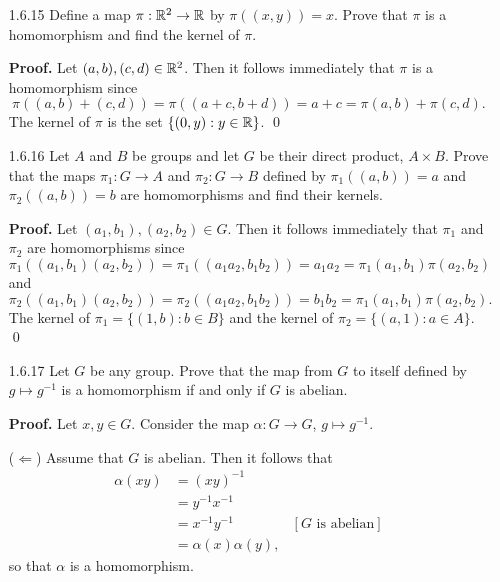\begin{enumerate}
      ($\Leftarrow$) Assume that ker($\varphi$) = $\{1_G\}$. Suppose that
      $\varphi(g_1) = \varphi(g_2)$ for some $g_1, g_2 \in G$. Then it follows
      that $\varphi(g_1)\varphi(g_2)^{-1} = 1_H$, so that
      $\varphi(g_1{g_2}^{-1}) = 1_H$. Since ker($\varphi$) = $\{1_G\}$, we can
      conclude that $g_1{g_2}^{-1} = 1_G$, so that $g_1 = g_2$; i.e., $\varphi$
      is injective. \qed      
   \item[1.6.15]  Define a map $\pi : \mathbb{R}^2 \rightarrow \mathbb{R}$ by $\pi((x, y)) = x$.
                  Prove that $\pi$ is a homomorphism and find the kernel of
                  $\pi$.

      \textbf{Proof.} Let $(a, b), (c, d) \in \mathbb{R}^2$. Then it follows immediately
      that $\pi$ is a homomorphism since
      $$\pi((a, b) + (c, d)) = \pi((a + c, b + d)) =
         a + c = \pi(a, b) + \pi(c, d).$$
      The kernel of $\pi$ is the set $\{(0, y) : y \in \mathbb{R}\}$. \qed
   \item[1.6.16]  Let $A$ and $B$ be groups and let $G$ be their direct product,
                  $A \times B$. Prove that the maps $\pi_1 : G \rightarrow A$
                  and $\pi_2 : G \rightarrow B$ defined by $\pi_1((a, b)) = a$
                  and $\pi_2((a, b)) = b$ are homomorphisms and find their
                  kernels.

      \textbf{Proof.} Let $(a_1, b_1), (a_2, b_2) \in G$. Then it follows 
      immediately that $\pi_1$ and $\pi_2$ are homomorphisms since
      $$\pi_1((a_1, b_1)(a_2, b_2)) = \pi_1((a_1a_2, b_1b_2)) =
         a_1a_2 = \pi_1(a_1, b_1)\pi(a_2, b_2)$$
      and
      $$\pi_2((a_1, b_1)(a_2, b_2)) = \pi_2((a_1a_2, b_1b_2)) =
         b_1b_2 = \pi_1(a_1, b_1)\pi(a_2, b_2).$$
      The kernel of $\pi_1 = \{(1, b) : b \in B\}$ and
      the kernel of $\pi_2 = \{(a, 1) : a \in A\}$. \qed
   \item[1.6.17]  Let $G$ be any group. Prove that the map from $G$ to itself
                  defined by $g \mapsto g^{-1}$ is a homomorphism if and only if
                  $G$ is abelian.

      \textbf{Proof.} Let $x, y \in G$. Consider the map
      $\alpha : G \rightarrow G$, $g \mapsto g^{-1}$. 

      ($\Leftarrow$) Assume that $G$ is abelian. Then it
      follows that
      \begin{align*}
         \alpha(xy) &= (xy)^{-1} \\
            &= y^{-1}x^{-1} \\
            &= x^{-1}y^{-1} &[G \text{ is abelian}] \\
            &= \alpha(x)\alpha(y),
      \end{align*}
      so that $\alpha$ is a homomorphism.


\end{enumerate}
